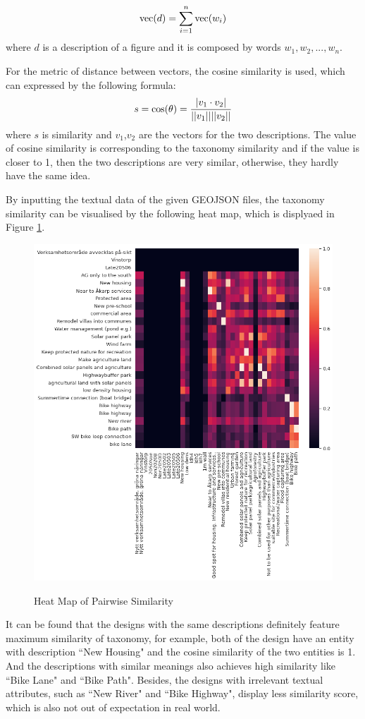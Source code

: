 \begin{equation}
    {\rm vec}(d)=\sum_{i=1}^{n}{\rm vec}(w_i)
\end{equation}
where $d$ is a description of a figure and it is composed by words $w_1,w_2,...,w_n$.
\par
For the metric of distance between vectors, the cosine similarity is used, which can expressed by the following formula:
\begin{equation}
    s={\rm cos}(\theta)=\frac{|v_1\cdot v_2|}{||v_1||||v_2||}
\end{equation}
where $s$ is similarity and $v_1$,$v_2$ are the vectors for the two descriptions. The value of cosine similarity is corresponding to the taxonomy similarity and if the value is closer to 1, then the two descriptions are very similar, otherwise, they hardly have the same idea. 
\par
By inputting the textual data of the given GEOJSON files, the taxonomy similarity can be visualised by the following heat map, which is displyaed in Figure \ref{heat}.
\begin{figure}[H]
\caption{Heat Map of Pairwise Similarity}
\centering
\includegraphics[scale=0.45]{heat.png}
\label{heat}
\end{figure}
\par
It can be found that the designs with the same descriptions definitely feature maximum similarity of taxonomy, for example, both of the design have an entity with description ``New Housing" and the cosine similarity of the two entities is 1. And the descriptions with similar meanings also achieves high similarity like ``Bike Lane" and ``Bike Path". Besides, the designs with irrelevant textual attributes, such as ``New River" and ``Bike Highway", display less similarity score, which is also not out of expectation in real world. 
